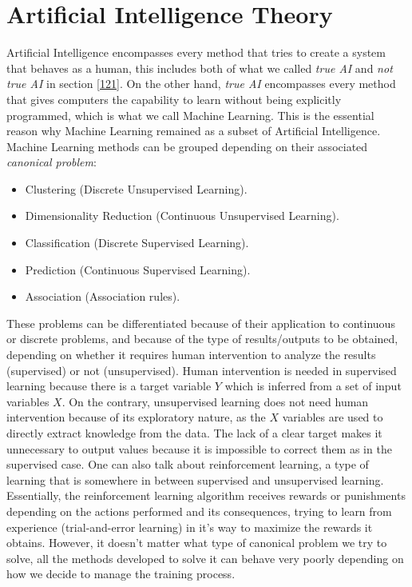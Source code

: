 %
%
%
%
%
%
%
%
%
%
%
%
%
%
%
%
%
%
%
%
%
%
%
%
%
%
%
%
%
%
%
%
\section{Artificial Intelligence Theory}
Artificial Intelligence encompasses every method that tries to create a system that behaves as a human, this includes both of what we called \textit{true AI} and \textit{not true AI} in section \ref{121}. On the other hand, \textit{true AI} encompasses every method that gives computers the capability to learn without being explicitly programmed, which is what we call Machine Learning. This is the essential reason why Machine Learning remained as a subset of Artificial Intelligence.
Machine Learning methods can be grouped depending on their associated \textit{canonical problem}:
\begin{itemize}
    \item Clustering (Discrete Unsupervised Learning).
    \item Dimensionality Reduction (Continuous Unsupervised Learning).
    \item Classification (Discrete Supervised Learning).
    \item Prediction (Continuous Supervised Learning).
    \item Association (Association rules).
\end{itemize}
These problems can be differentiated because of their application to continuous or discrete problems, and because of the type of results/outputs to be obtained, depending on whether it requires human intervention to analyze the results (supervised) or not (unsupervised). Human intervention is needed in supervised learning because there is a target variable $Y$ which is inferred from a set of input variables $X$.
On the contrary, unsupervised learning does not need human intervention because of its exploratory nature, as the $X$ variables are used to directly extract knowledge from the data. The lack of a clear target makes it unnecessary to output values because it is impossible to correct them as in the supervised case.
One can also talk about reinforcement learning, a type of learning that is somewhere in between supervised and unsupervised learning. Essentially, the reinforcement learning algorithm receives rewards or punishments depending on the actions performed and its consequences, trying to learn from experience (trial-and-error learning) in it's way to maximize the rewards it obtains. However, it doesn't matter what type of canonical problem we try to solve, all the methods developed to solve it can behave very poorly depending on how we decide to manage the training process.\\



